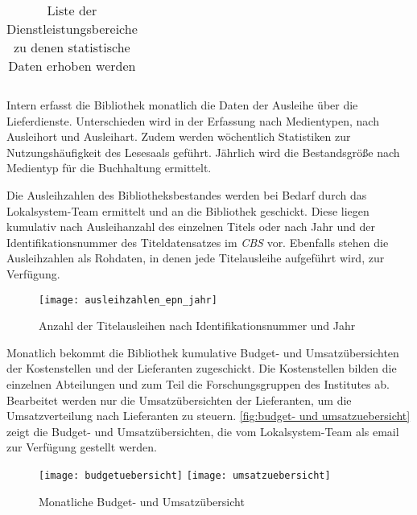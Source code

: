 \begin{table}[h]
\begin{adjustbox}{max width=\textwidth}
\begin{tabular}{lllclllcc}
        \bottomrule
    \end{tabular}
    \end{adjustbox}
    \caption{%
        Liste der Dienstleistungsbereiche zu denen statistische Daten erhoben werden
    \label{tab:Statistische_Daten}
    }
     \end{table}
\endgroup


Intern erfasst die Bibliothek monatlich die Daten der Ausleihe über die Lieferdienste. Unterschieden 
wird in der Erfassung nach Medientypen, nach Ausleihort und Ausleihart. Zudem werden wöchentlich 
Statistiken zur Nutzungshäufigkeit des Lesesaals geführt. Jährlich wird die Bestandsgröße nach 
Medientyp für die Buchhaltung ermittelt.

Die Ausleihzahlen des Bibliotheksbestandes werden bei Bedarf durch das Lokalsystem-Team ermittelt und an die Bibliothek geschickt. 
Diese liegen kumulativ nach Ausleihanzahl des einzelnen Titels oder nach Jahr und der Identifikationsnummer des Titeldatensatzes im 
\textit{\acrshort{CBS}} vor. Ebenfalls stehen die Ausleihzahlen als Rohdaten, in denen jede Titelausleihe aufgeführt wird, zur Verfügung.

\begin{figure}[H]
    \centering
        \texttt{[image: ausleihzahlen\_epn\_jahr]}
        \caption{Anzahl der Titelausleihen nach Identifikationsnummer und Jahr}
        \label{fig:Titelausleihen}
\end{figure}


Monatlich bekommt die Bibliothek kumulative Budget- und Umsatzübersichten der Kostenstellen und der Lieferanten zugeschickt. 
Die Kostenstellen bilden die einzelnen Abteilungen und zum Teil die Forschungsgruppen des Institutes ab. 
Bearbeitet werden nur die Umsatzübersichten der Lieferanten, um die Umsatzverteilung nach Lieferanten zu steuern.
\autoref{fig:budget- und umsatzuebersicht} zeigt die Budget- und Umsatzübersichten, die vom Lokalsystem-Team als email zur Verfügung gestellt werden.


\begin{figure}[h]
    \centering
        \texttt{[image: budgetuebersicht]}
        \texttt{[image: umsatzuebersicht]}
        \caption{Monatliche Budget- und Umsatzübersicht}
        \label{fig:budget- und umsatzuebersicht}
\end{figure}

